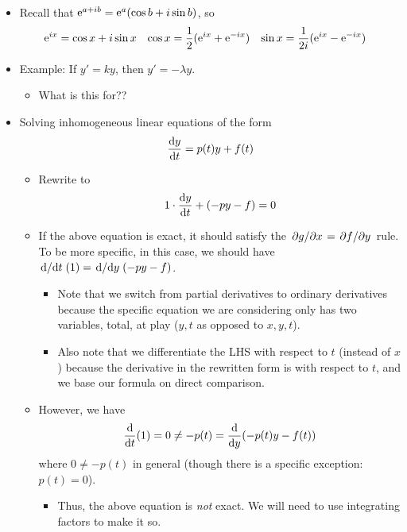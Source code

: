 \documentclass[../notes.tex]{subfiles}
\begin{document}
\begin{itemize}
    \item Recall that $\e[a+ib]=\e[a](\cos b+i\sin b)$, so
    \begin{align*}
        \e[ix] &= \cos x+i\sin x&
        \cos x &= \frac{1}{2}(\e[ix]+\e[-ix])&
        \sin x &= \frac{1}{2i}(\e[ix]-\e[-ix])
    \end{align*}
    \item Example: If $y'=ky$, then $y'=-\lambda y$.
    \begin{itemize}
        \item What is this for??
    \end{itemize}
    \pagebreak
    \item Solving inhomogeneous linear equations of the form
    \begin{equation*}
        \dv{y}{t} = p(t)y+f(t)
    \end{equation*}
    \begin{itemize}
        \item Rewrite to
        \begin{equation*}
            1\cdot\dv{y}{t}+(-py-f) = 0
        \end{equation*}
        \item If the above equation is exact, it should satisfy the $\pdv*{g}{x}=\pdv*{f}{y}$ rule. To be more specific, in this case, we should have $\dv*{t}(1)=\dv*{y}(-py-f)$.
        \begin{itemize}
            \item Note that we switch from partial derivatives to ordinary derivatives because the specific equation we are considering only has two variables, total, at play ($y,t$ as opposed to $x,y,t$).
            \item Also note that we differentiate the LHS with respect to $t$ (instead of $x$) because the derivative in the rewritten form is with respect to $t$, and we base our formula on direct comparison.
        \end{itemize}
        \item However, we have
        \begin{equation*}
            \dv{t}(1) = 0 \neq -p(t) = \dv{y}(-p(t)y-f(t))
        \end{equation*}
        where $0\neq -p(t)$ in general (though there is a specific exception: $p(t)=0$).
        \begin{itemize}
            \item Thus, the above equation is \emph{not} exact. We will need to use integrating factors to make it so.

\end{itemize}
\end{itemize}
\end{itemize}
\end{document}
